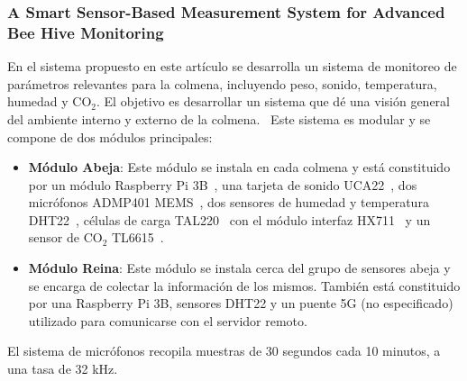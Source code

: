 \subsubsection{A Smart Sensor-Based Measurement System for Advanced Bee Hive Monitoring}
En el sistema propuesto en este artículo se desarrolla un sistema de monitoreo de parámetros relevantes para la colmena, incluyendo peso, sonido, temperatura, humedad y CO$_2$. El objetivo es desarrollar un sistema que dé una visión general del ambiente interno y externo de la colmena.~\cite{cecchi_spinsante_terenzi_orcioni_2020}
Este sistema es modular y se compone de dos módulos principales:
\begin{itemize}
    \item \textbf{Módulo Abeja}: Este módulo se instala en cada colmena y está constituido por un módulo Raspberry Pi 3B~\cite{buy_raspberry_pi3_model_b}, una tarjeta de sonido UCA22~\cite{behringer_uca222}, dos micrófonos ADMP401 MEMS~\cite{admp401_datasheet}, dos sensores de humedad y temperatura DHT22~\cite{liu}, células de carga TAL220~\cite{loadcell_tal220_sparkfun} con el módulo interfaz HX711~\cite{hx711_sparkfun} y un sensor de CO$_2$ TL6615~\cite{t6615_telaire}.
    \item \textbf{Módulo Reina}: Este módulo se instala cerca del grupo de sensores abeja y se encarga de colectar la información de los mismos. También está constituido por una Raspberry Pi 3B, sensores DHT22 y un puente 5G (no especificado) utilizado para comunicarse con el servidor remoto.~\cite{cecchi_spinsante_terenzi_orcioni_2020}
\end{itemize}
El sistema de micrófonos recopila muestras de 30 segundos cada 10 minutos, a una tasa de 32 kHz.

